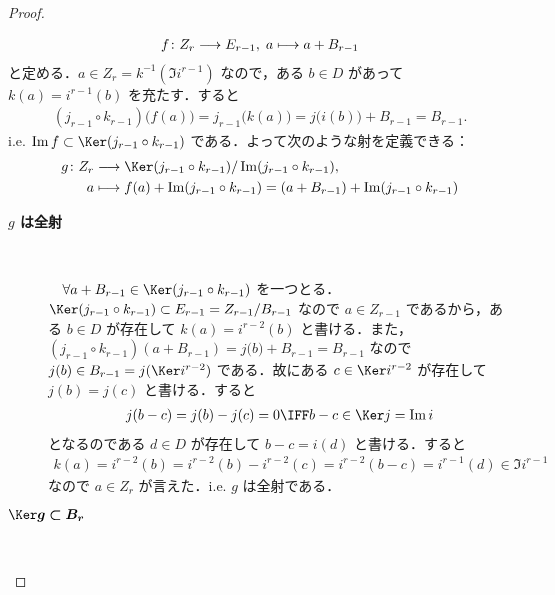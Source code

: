 \documentclass[algtopo_main]{subfiles}
\begin{document}
\begin{proof}
\begin{description}
\begin{description}
            \begin{align}
                f \colon Z_r \longrightarrow E_{r-1},\; a \longmapsto a + B_{r-1}
            \end{align}
            と定める．$a \in Z_r = k^{-1}(\Im i^{r-1})$ なので，ある $b \in D$ があって $k(a) = i^{r-1}(b)$ を充たす．すると
            \begin{align}
                (j_{r-1} \circ k_{r-1}) \bigl( f(a) \bigr) = j_{r-1} \bigl( k(a) \bigr) = j \bigl( i(b) \bigr) + B_{r-1} = B_{r-1}.
            \end{align}
            i.e. $\Im f \subset \Ker (j_{r-1} \circ k_{r-1})$ である．よって次のような射を定義できる：
            \begin{align}
                g\colon Z_r &\lto \Ker (j_{r-1} \circ k_{r-1}) / \Im (j_{r-1} \circ k_{r-1}), \\
                a &\lmto f(a) + \Im (j_{r-1} \circ k_{r-1}) = (a + B_{r-1}) + \Im (j_{r-1} \circ k_{r-1})
            \end{align}
            \begin{description}
                \item[\textbf{$g$ は全射}] 　
                
                　$\forall a + B_{r-1} \in \Ker (j_{r-1} \circ k_{r-1})$ を一つとる．$\Ker (j_{r-1} \circ k_{r-1}) \subset E_{r-1} = Z_{r-1} / B_{r-1}$ なので $a \in Z_{r-1}$ であるから，ある $b \in D$ が存在して $k(a) = i^{r-2}(b)$ と書ける．また，
                $(j_{r-1} \circ k_{r-1})(a + B_{r-1}) = j \bigl( b \bigr) + B_{r-1} = B_{r-1}$ なので $j(b) \in B_{r-1} = j(\Ker i^{r-2})$ である．故にある $c \in \Ker i^{r-2}$ が存在して $j(b) = j(c)$ と書ける．すると
                \begin{align}
                    j(b - c) = j(b) - j(c) = 0 \IFF b-c \in \Ker j = \Im i
                \end{align}
                となるのである $d \in D$ が存在して $b-c = i(d)$ と書ける．すると
                \begin{align}
                    k(a) = i^{r-2}(b) = i^{r-2}(b) - i^{r-2}(c) = i^{r-2}(b-c) = i^{r-1}(d) \in \Im i^{r-1}
                \end{align}
                なので $a \in Z_r$ が言えた．i.e. $g$ は全射である．
                \item[\textbf{$\bm{\Ker g \subset B_r}$}]　 
                

\end{description}
\end{description}
\end{description}
\end{proof}
\end{document}
